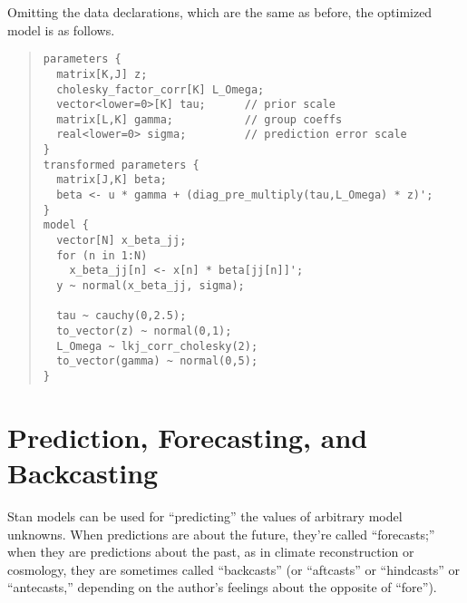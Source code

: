 Omitting the data declarations, which are the same as before, the
optimized model is as follows.
%
\begin{quote}\small
\begin{Verbatim}
parameters {
  matrix[K,J] z;
  cholesky_factor_corr[K] L_Omega;  
  vector<lower=0>[K] tau;      // prior scale
  matrix[L,K] gamma;           // group coeffs
  real<lower=0> sigma;         // prediction error scale
}
transformed parameters {
  matrix[J,K] beta;
  beta <- u * gamma + (diag_pre_multiply(tau,L_Omega) * z)';
}
model {
  vector[N] x_beta_jj;
  for (n in 1:N)
    x_beta_jj[n] <- x[n] * beta[jj[n]]';
  y ~ normal(x_beta_jj, sigma);

  tau ~ cauchy(0,2.5);
  to_vector(z) ~ normal(0,1); 
  L_Omega ~ lkj_corr_cholesky(2);
  to_vector(gamma) ~ normal(0,5);
}
\end{Verbatim}
\end{quote}




\section{Prediction, Forecasting, and Backcasting}

Stan models can be used for ``predicting'' the values of arbitrary
model unknowns.  When predictions are about the future, they're called
``forecasts;'' when they are predictions about the past, as in climate
reconstruction or cosmology, they are sometimes called ``backcasts''
(or ``aftcasts'' or ``hindcasts'' or ``antecasts,'' depending on the
author's feelings about the opposite of ``fore'').

